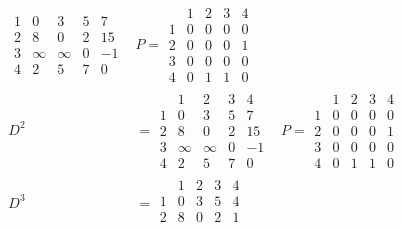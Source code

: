 \documentclass{article}
\begin{document}
\begin{multicols*}{2}
\begin{align*}
\begin{array}{c|cccc}
                    \hline
                    1 & 0      & 3      & 5 & 7  \\
                    2 & 8      & 0      & 2 & 15 \\
                    3 & \infty & \infty & 0 & -1 \\
                    4 & 2      & 5      & 7 & 0
                \end{array}
            & P = \begin{array}{c|cccc}
                        & 1 & 2 & 3 & 4 \\
                      \hline
                      1 & 0 & 0 & 0 & 0 \\
                      2 & 0 & 0 & 0 & 1 \\
                      3 & 0 & 0 & 0 & 0 \\
                      4 & 0 & 1 & 1 & 0
                  \end{array}                \\
        D^2 & = \begin{array}{c|cccc}
                      & 1      & 2      & 3 & 4  \\
                    \hline
                    1 & 0      & 3      & 5 & 7  \\
                    2 & 8      & 0      & 2 & 15 \\
                    3 & \infty & \infty & 0 & -1 \\
                    4 & 2      & 5      & 7 & 0
                \end{array}
            & P = \begin{array}{c|cccc}
                        & 1 & 2 & 3 & 4 \\
                      \hline
                      1 & 0 & 0 & 0 & 0 \\
                      2 & 0 & 0 & 0 & 1 \\
                      3 & 0 & 0 & 0 & 0 \\
                      4 & 0 & 1 & 1 & 0
                  \end{array}                \\
        D^3 & = \begin{array}{c|cccc}
                      & 1      & 2      & 3 & 4  \\
                    \hline
                    1 & 0      & 3      & 5 & 4  \\
                    2 & 8      & 0      & 2 & 1  \\

\end{array}
\end{align*}
\end{multicols*}
\end{document}
